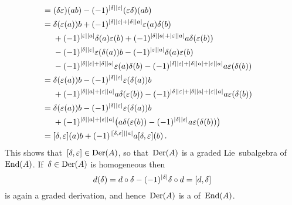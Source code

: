 \begin{enumerate}
\begin{align*}
      \\
      ={}&
        (\delta \varepsilon)(ab)
      - (-1)^{\lvert\delta\rvert \lvert\varepsilon\rvert}
        (\varepsilon \delta)(ab)
      \\
      ={}&
        \delta(\varepsilon(a)) b
      + (-1)^{\lvert\delta\rvert \lvert\varepsilon\rvert + \lvert\delta\rvert \lvert a\rvert}
        \varepsilon(a) \delta(b)
      \\
      {}&
      + (-1)^{\lvert\varepsilon\rvert \lvert a\rvert}
        \delta(a) \varepsilon(b)
      + (-1)^{\lvert\delta\rvert \lvert a\rvert + \lvert\varepsilon\rvert \lvert a\rvert}
        a \delta(\varepsilon(b))
      \\
      {}&
      - (-1)^{\lvert\delta\rvert \lvert\varepsilon\rvert}
        \varepsilon(\delta(a)) b
      - (-1)^{\lvert\varepsilon\rvert \lvert a\rvert}
        \delta(a) \varepsilon(b)
      \\
      {}&
      - (-1)^{\lvert\delta\rvert \lvert\varepsilon\rvert + \lvert\delta\rvert \lvert a\rvert}
        \varepsilon(a) \delta(b)
      - (-1)^{\lvert\delta\rvert \lvert\varepsilon\rvert  + \lvert\delta\rvert \lvert a\rvert + \lvert\varepsilon\rvert \lvert a\rvert}
        a \varepsilon(\delta(b))
      \\
      ={}&
        \delta(\varepsilon(a)) b
      - (-1)^{\lvert\delta\rvert \lvert\varepsilon\rvert}
        \varepsilon(\delta(a)) b
      \\
      {}&
      + (-1)^{\lvert\delta\rvert \lvert a\rvert + \lvert\varepsilon\rvert \lvert a\rvert}
        a \delta(\varepsilon(b))
      - (-1)^{\lvert\delta\rvert \lvert\varepsilon\rvert  + \lvert\delta\rvert \lvert a\rvert + \lvert\varepsilon\rvert \lvert a\rvert}
        a \varepsilon(\delta(b))
      \\
      ={}&
        \delta(\varepsilon(a)) b
      - (-1)^{\lvert\delta\rvert \lvert\varepsilon\rvert}
        \varepsilon(\delta(a)) b
      \\
      {}&
      + (-1)^{\lvert\delta\rvert \lvert a\rvert + \lvert\varepsilon\rvert \lvert a\rvert}
        \bigl(
            a \delta(\varepsilon(b))
          - (-1)^{\lvert\delta\rvert \lvert\varepsilon\rvert}
            a \varepsilon(\delta(b))
        \bigr)
      \\
      ={}&
        [\delta, \varepsilon](a) b
      + (-1)^{\lvert[\delta, \varepsilon]\rvert \lvert a\rvert}
        a [\delta, \varepsilon](b) \,.
    \end{align*}
    \endgroup
    This shows that~$[\delta, \varepsilon] \in \operatorname{Der}(A)$, so that~$\operatorname{Der}(A)$ is a graded Lie~subalgebra of~$\operatorname{End}(A)$.
    If~$\delta \in \operatorname{Der}(A)$ is homogeneous then
    \[
      d(\delta)
      =
      d \circ \delta
      - (-1)^{\lvert\delta\rvert}
      \delta \circ d
      =
      [d, \delta]
    \]
    is again a graded derivation, and hence~$\operatorname{Der}(A)$ is a {\dgsub} of~$\operatorname{End}(A)$.
    

\end{enumerate}
